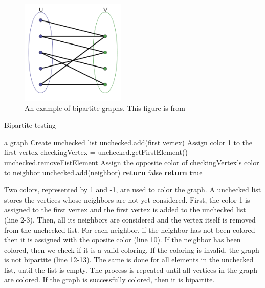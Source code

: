 \documentclass[a4paper]{report}
\begin{document}
			\begin{figure}[h]
				\centering
				\includegraphics[width=50mm,scale=0.5]{figures/bipartite.png}
				\caption{An example of bipartite graphs. This figure is from \protect\cite{bipartiteFig}}
				\label{fig:bipartite}
			\end{figure}
			
			\begin{algorithm}
				\caption{Bipartite testing}
				\label{alg:bipartite}
			
				\begin{algorithmic}[1]
					\REQUIRE a graph
					\STATE Create unchecked list
					\STATE unchecked.add(first vertex)
					\STATE Assign color 1 to the first vertex
					\STATE checkingVertex = unchecked.getFirstElement()
					\STATE unchecked.removeFistElement
					\STATE Assign the opposite color of checkingVertex's color to neighbor
					\STATE unchecked.add(neighbor)
					\STATE \textbf{return} false
					\ENDIF
					\ENDFOR
					\ENDWHILE
					\ENDWHILE
					\STATE \textbf{return} true
				\end{algorithmic}
			\end{algorithm}
			 Two colors, represented by 1 and -1, are used to color the graph. A unchecked list stores the vertices whose neighbors are not yet considered. First, the color 1 is assigned to the first vertex and the first vertex is added to the unchecked list (line 2-3). Then, all its neighbors are considered and the vertex itself is removed from the unchecked list. For each neighbor, if the neighbor has not been colored then it is assigned with the oposite color (line 10). If the neighbor has been colored, then we check if it is a valid coloring. If the coloring is invalid, the graph is not bipartite (line 12-13). The same is done for all elements in the unchecked list, until the list is empty. The process is repeated until all vertices in the graph are colored. If the graph is successfully colored, then it is bipartite.
\end{document}
